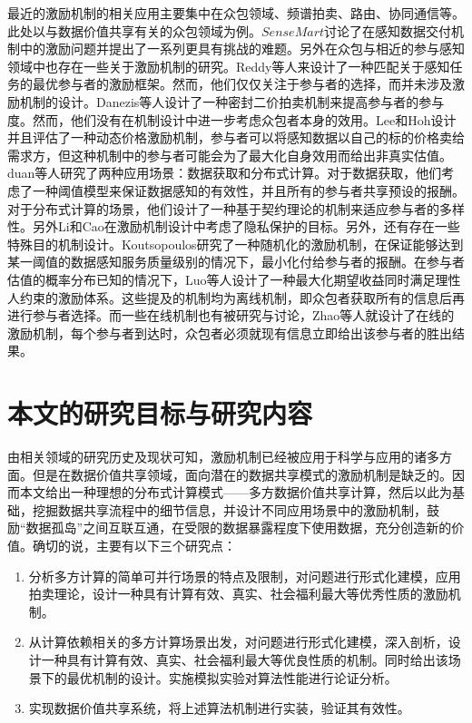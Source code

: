 \documentclass[promaster]{thesis-uestc}
\begin{document}
最近的激励机制的相关应用主要集中在众包领域、频谱拍卖\cite{gao2010map}\cite{wang2011district}\cite{yang2014promise}\cite{zhou2008ebay}、路由\cite{zhong2007designing}、协同通信\cite{chen2010conflicts}\cite{yang2011truthful}等。此处以与数据价值共享有关的众包领域为例。$SenseMart$\cite{chou2007sensing}讨论了在感知数据交付机制中的激励问题并提出了一系列更具有挑战的难题。另外在众包与相近的参与感知领域中也存在一些关于激励机制的研究。Reddy等人来设计了一种匹配关于感知任务的最优参与者的激励框架。然而，他们仅仅关注于参与者的选择，而并未涉及激励机制的设计。Danezis等人设计了一种密封二价拍卖机制来提高参与者的参与度。然而，他们没有在机制设计中进一步考虑众包者本身的效用。Lee和Hoh设计并且评估了一种动态价格激励机制，参与者可以将感知数据以自己的标的价格卖给需求方，但这种机制中的参与者可能会为了最大化自身效用而给出非真实估值。duan等人研究了两种应用场景：数据获取和分布式计算。对于数据获取，他们考虑了一种阈值模型来保证数据感知的有效性，并且所有的参与者共享预设的报酬。对于分布式计算的场景，他们设计了一种基于契约理论的机制来适应参与者的多样性。另外Li和Cao在激励机制设计中考虑了隐私保护的目标。另外，还有存在一些特殊目的机制设计。Koutsopoulos研究了一种随机化的激励机制，在保证能够达到某一阈值的数据感知服务质量级别的情况下，最小化付给参与者的报酬。在参与者估值的概率分布已知的情况下，Luo等人设计了一种最大化期望收益同时满足理性人约束的激励体系。这些提及的机制均为离线机制，即众包者获取所有的信息后再进行参与者选择。而一些在线机制也有被研究与讨论，Zhao等人就设计了在线的激励机制，每个参与者到达时，众包者必须就现有信息立即给出该参与者的胜出结果。



\section{本文的研究目标与研究内容}
由相关领域的研究历史及现状可知，激励机制已经被应用于科学与应用的诸多方面。但是在数据价值共享领域，面向潜在的数据共享模式的激励机制是缺乏的。因而本文给出一种理想的分布式计算模式——多方数据价值共享计算，然后以此为基础，挖掘数据共享流程中的细节信息，并设计不同应用场景中的激励机制，鼓励“数据孤岛”之间互联互通，在受限的数据暴露程度下使用数据，充分创造新的价值。确切的说，主要有以下三个研究点：
\begin{enumerate}
    \item 分析多方计算的简单可并行场景的特点及限制，对问题进行形式化建模，应用拍卖理论，设计一种具有计算有效、真实、社会福利最大等优秀性质的激励机制。
    \item 从计算依赖相关的多方计算场景出发，对问题进行形式化建模，深入剖析，设计一种具有计算有效、真实、社会福利最大等优良性质的机制。同时给出该场景下的最优机制的设计。实施模拟实验对算法性能进行论证分析。
    \item 实现数据价值共享系统，将上述算法机制进行实装，验证其有效性。
\end{enumerate}
\end{document}
